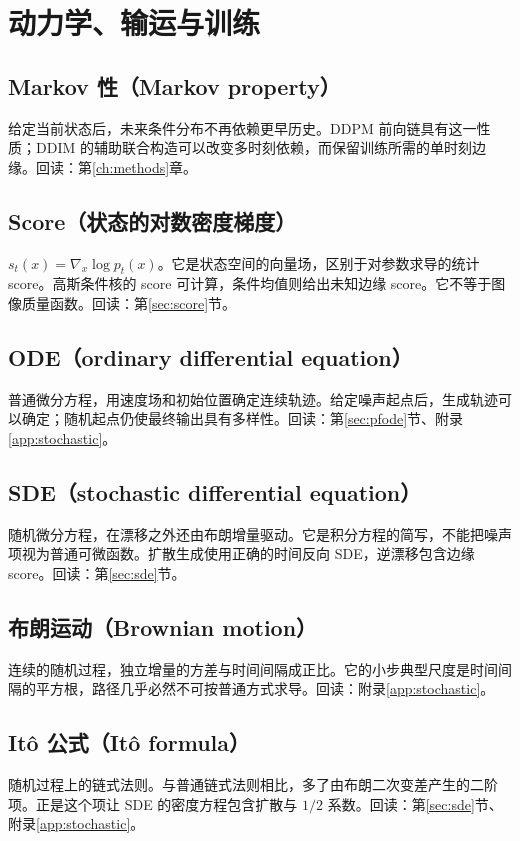 \section{动力学、输运与训练}
\subsection*{Markov 性（Markov property）}\label{gl:markov}
给定当前状态后，未来条件分布不再依赖更早历史。DDPM 前向链具有这一性质；DDIM 的辅助联合构造可以改变多时刻依赖，而保留训练所需的单时刻边缘。回读：第\ref{ch:methods}章。

\subsection*{Score（状态的对数密度梯度）}\label{gl:score}
$s_t(x)=\nabla_x\log p_t(x)$。它是状态空间的向量场，区别于对参数求导的统计 score。高斯条件核的 score 可计算，条件均值则给出未知边缘 score。它不等于图像质量函数。回读：第\ref{sec:score}节。

\subsection*{ODE（ordinary differential equation）}\label{gl:ode}
普通微分方程，用速度场和初始位置确定连续轨迹。给定噪声起点后，生成轨迹可以确定；随机起点仍使最终输出具有多样性。回读：第\ref{sec:pfode}节、附录\ref{app:stochastic}。

\subsection*{SDE（stochastic differential equation）}\label{gl:sde}
随机微分方程，在漂移之外还由布朗增量驱动。它是积分方程的简写，不能把噪声项视为普通可微函数。扩散生成使用正确的时间反向 SDE，逆漂移包含边缘 score。回读：第\ref{sec:sde}节。

\subsection*{布朗运动（Brownian motion）}\label{gl:brownian}
连续的随机过程，独立增量的方差与时间间隔成正比。它的小步典型尺度是时间间隔的平方根，路径几乎必然不可按普通方式求导。回读：附录\ref{app:stochastic}。

\subsection*{It\^o 公式（It\^o formula）}\label{gl:ito}
随机过程上的链式法则。与普通链式法则相比，多了由布朗二次变差产生的二阶项。正是这个项让 SDE 的密度方程包含扩散与 $1/2$ 系数。回读：第\ref{sec:sde}节、附录\ref{app:stochastic}。

